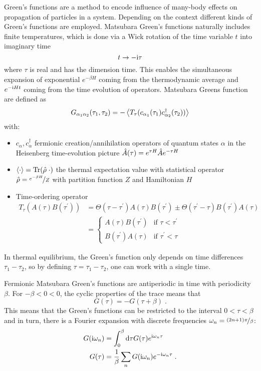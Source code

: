 \documentclass[../notes.tex]{subfiles}
\begin{document}
Green's functions are a method to encode influence of many-body effects on propagation of particles in a system.
Depending on the context different kinds of Green's functions are employed.
Matsubara Green's functions naturally includes finite temperatures, which is done via a Wick rotation of the time variable \(t\) into imaginary time
\begin{equation}
	t \to -\mathrm{i} \tau
\end{equation}
where \(\tau\) is real and has the dimension time.
This enables the simultaneous expansion of exponential \(e^{-\beta H}\) coming from the thermodynamic average and \(e^{-\mathrm{i} H t}\) coming from the time evolution of operators.
Matsubara Greens function are defined as
\begin{equation}
	G_{\alpha_1 \alpha_2} (\tau_1, \tau_2) = - \Braket{T_{\tau} (c_{\alpha_1}(\tau_1) c^{\dagger}_{\alpha_2} (\tau_2))}
\end{equation}
with:
\begin{itemize}
	\item \(c_{\alpha}, c^{\dagger}_{\alpha}\) fermionic creation/annihilation operators of quantum states \(\alpha\) in the Heisenberg time-evolution picture \(\hat{A} (\tau) = e^{\tau H} \hat{A} e^{-\tau H}\)
	\item \(\braket{\cdot} = \operatorname{Tr}(\hat{\rho}\; \cdot)\) the thermal expectation value with statistical operator \(\hat{\rho} = \nicefrac{e^{-\beta H}}{Z}\) with partition function \(Z\) and Hamiltonian \(H\)
	\item Time-ordering operator
	\begin{align}
		T_{\tau} (A(\tau) B(\tau^{\prime})) &= \Theta(\tau - \tau^{\prime}) A(\tau) B(\tau^{\prime}) \pm \Theta(\tau^{\prime} - \tau) B(\tau^{\prime}) A(\tau) \nonumber \\
		&= \begin{cases}
			A (\tau) B(\tau^{\prime}) & \text{if } \tau < \tau^{\prime} \\
			B(\tau^{\prime}) A (\tau) & \text{if } \tau^{\prime} < \tau
		\end{cases}
	\end{align}
\end{itemize}
In thermal equilibrium, the Green's function only depends on time differences \(\tau_1 - \tau_2\), so by defining \(\tau = \tau_1 - \tau_2\), one can work with a single time.

Fermionic Matsubara Green's functions are antiperiodic in time with periodicity \(\beta\).
For \(-\beta < 0 < 0\), the cyclic properties of the trace means that
\begin{equation}
	G (\tau) = - G (\tau + \beta) \;.
\end{equation}
This means that the Green's functions can be restricted to the interval \(0 < \tau < \beta\) and in turn, there is a Fourier expansion with discrete frequencies \(\omega_n = \nicefrac{(2n + 1)\pi}{\beta}\):
\begin{align}
	G (\iu \omega_n) &= \int_{0}^{\beta} \odif{\tau} G (\tau) e^{\iu \omega_n \tau} \\
	G (\tau) &= \frac{1}{\beta} \sum_{n} G(\iu \omega_n) e^{-\iu \omega_n \tau} \;.
\end{align}
\end{document}
